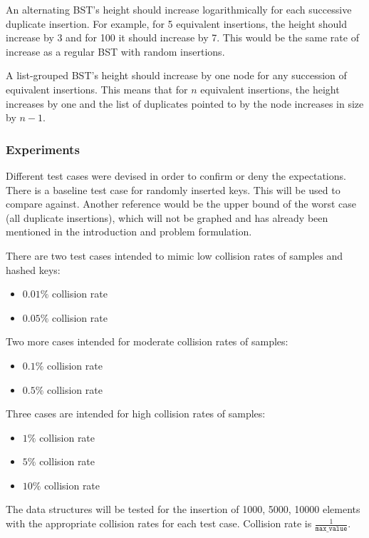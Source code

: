 \documentclass[fleqn,10pt]{SelfArx} %
\begin{document}
An alternating BST's height should increase logarithmically for each successive duplicate insertion. For example, for 5 equivalent insertions, the height should increase by 3 and for 100 it should increase by 7. This would be the same rate of increase as a regular BST with random insertions.

A list-grouped BST's height should increase by one node for any succession of equivalent insertions. This means that for $n$ equivalent insertions, the height increases by one and the list of duplicates pointed to by the node increases in size by $n-1$.

\subsubsection{Experiments}
Different test cases were devised in order to confirm or deny the expectations. There is a baseline test case for randomly inserted keys. This will be used to compare against. Another reference would be the upper bound of the worst case (all duplicate insertions), which will not be graphed and has already been mentioned in the introduction and problem formulation.

There are two test cases intended to mimic low collision rates of samples and hashed keys:
\begin{itemize}
	\item $0.01\%$ collision rate
	\item $0.05\%$ collision rate
\end{itemize}

Two more cases intended for moderate collision rates of samples:
\begin{itemize}
	\item $0.1\%$ collision rate
	\item $0.5\%$ collision rate
\end{itemize}

Three cases are intended for high collision rates of samples:
\begin{itemize}
	\item $1\%$ collision rate
	\item $5\%$ collision rate
	\item $10\%$ collision rate
\end{itemize}

The data structures will be tested for the insertion of 1000, 5000, 10000 elements with the appropriate collision rates for each test case. Collision rate is $\frac{1}{\texttt{max\_value}}$.
\end{document}
